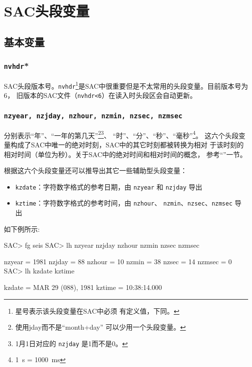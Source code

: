 \section{SAC头段变量}
\label{sec:sac-header-variables}

\subsection{基本变量}

\subsubsection{\texttt{nvhdr}*}
SAC头段版本号。\texttt{nvhdr}\footnote{星号表示该头段变量在SAC中必须
有定义值，下同。}是SAC中很重要但是不太常用的头段变量。目前版本号为6，
旧版本的SAC文件（\texttt{nvhdr<6}）在读入时头段区会自动更新。

\subsubsection{\texttt{nzyear, nzjday, nzhour, nzmin, nzsec, nzmsec}}
分别表示``年''、``一年的第几天''\footnote{使用jday而不是``month+day''
可以少用一个头段变量。}\footnote{1月1日对应的 \texttt{nzjday} 是1而不是0。}、
``时''、``分''、``秒''、``毫秒''\footnote{\SI{1}{\s} = \SI{1000}{\ms}}。
这六个头段变量构成了SAC中唯一的绝对时刻，SAC中的其它时刻都被转换为相对
于该时刻的相对时间（单位为秒）。关于SAC中的绝对时间和相对时间的概念，
参考``''一节。

根据这六个头段变量还可以推导出其它一些辅助型头段变量：
\begin{itemize}
\item \texttt{kzdate}：字符数字格式的参考日期，由 \texttt{nzyear} 和
    \texttt{nzjday} 导出
\item \texttt{kztime}：字符数字格式的参考时间，由 \texttt{nzhour}、
    \texttt{nzmin}、\texttt{nzsec}、\texttt{nzmsec} 导出
\end{itemize}

如下例所示:
\begin{SACCode}
SAC> fg seis
SAC> lh nzyear nzjday nzhour nzmin nzsec nzmsec

     nzyear = 1981
     nzjday = 88
     nzhour = 10
      nzmin = 38
      nzsec = 14
     nzmsec = 0
SAC> lh kzdate kztime

     kzdate = MAR 29 (088), 1981
     kztime = 10:38:14.000
\end{SACCode}


